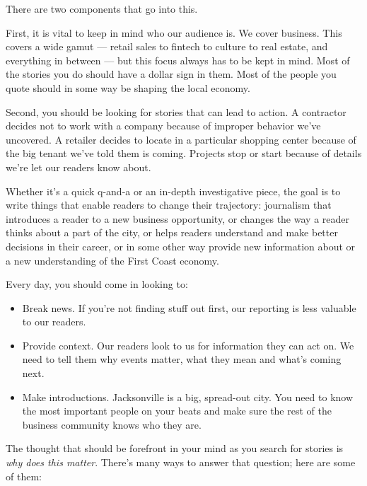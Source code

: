 \documentclass[
  11pt,
  american,
  letterpaperpaper,
  extrafontsizes,onecolumn,openright
  ]{memoir}
\providecommand{\tightlist}{%
  \setlength{\itemsep}{0pt}\setlength{\parskip}{0pt}}
\begin{document}
There are two components that go into this.

First, it is vital to keep in mind who our audience is. We cover business. This covers a wide gamut --- retail sales to fintech to culture to real estate, and everything in between --- but this focus always has to be kept in mind. Most of the stories you do should have a dollar sign in them. Most of the people you quote should in some way be shaping the local economy.

Second, you should be looking for stories that can lead to action. A contractor decides not to work with a company because of improper behavior we've uncovered. A retailer decides to locate in a particular shopping center because of the big tenant we've told them is coming. Projects stop or start because of details we're let our readers know about.

Whether it's a quick q-and-a or an in-depth investigative piece, the goal is to write things that enable readers to change their trajectory: journalism that introduces a reader to a new business opportunity, or changes the way a reader thinks about a part of the city, or helps readers understand and make better decisions in their career, or in some other way provide new information about or a new understanding of the First Coast economy.

Every day, you should come in looking to:

\begin{itemize}
\tightlist
\item
  Break news. If you're not finding stuff out first, our reporting is less valuable to our readers.
\item
  Provide context. Our readers look to us for information they can act on. We need to tell them why events matter, what they mean and what's coming next.
\item
  Make introductions. Jacksonville is a big, spread-out city. You need to know the most important people on your beats and make sure the rest of the business community knows who they are.
\end{itemize}

The thought that should be forefront in your mind as you search for stories is \emph{why does this matter}. There's many ways to answer that question; here are some of them:
\end{document}
